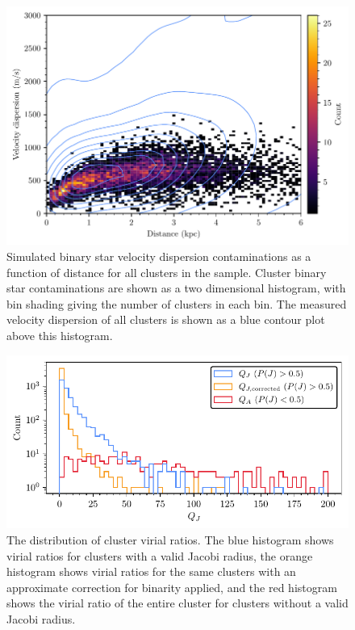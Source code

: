 \begin{figure}[t]
    \centering
    \includegraphics[width=\textwidth]{fig/c4/dispersion_binaries.pdf}
    \caption[Simulated binary star velocity dispersion contaminations as a function of distance for all clusters in the sample]{Simulated binary star velocity dispersion contaminations as a function of distance for all clusters in the sample. Cluster binary star contaminations are shown as a two dimensional histogram, with bin shading giving the number of clusters in each bin. The measured velocity dispersion of all clusters is shown as a blue contour plot above this histogram.}
    \label{fig:dynamics:velocities:binary_contamination}
\end{figure}

\begin{figure}[t]
    \centering
    \includegraphics[width=\textwidth]{fig/c4/results_q_distribution.pdf}
    \caption[The distribution of cluster virial ratios]{The distribution of cluster virial ratios. The blue histogram shows virial ratios for clusters with a valid Jacobi radius, the orange histogram shows virial ratios for the same clusters with an approximate correction for binarity applied, and the red histogram shows the virial ratio of the entire cluster for clusters without a valid Jacobi radius.}
    \label{fig:dynamics:results:virial_ratio_distribution}
\end{figure}


